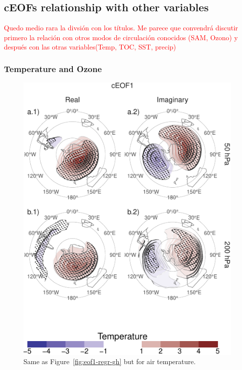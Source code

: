 \documentclass[smallextended]{svjour3}       %
\begin{document}
\hypertarget{ceofs-relationship-with-other-variables}{%
\subsection{cEOFs relationship with other variables}\label{ceofs-relationship-with-other-variables}}

\textcolor{red}{Quedo medio rara la divsión con los títulos. Me parece que convendrá discutir primero la relación con otros modos de circulación conocidos (SAM, Ozono) y después con las otras variables(Temp, TOC, SST, precip)}

\hypertarget{temperature-and-ozone}{%
\subsubsection{Temperature and Ozone}\label{temperature-and-ozone}}



\begin{figure}
\centering
\includegraphics{../figures/eof1-regr-t-1.pdf}
\caption{\label{fig:eof1-regr-t}Same as Figure~\ref{fig:eof1-regr-gh} but for air temperature.}
\end{figure}
\end{document}
